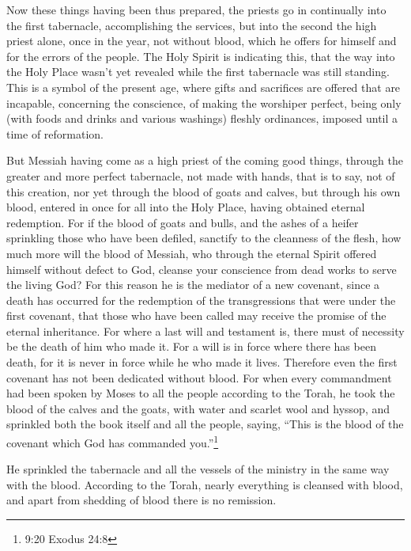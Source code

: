 \myverse{}Now these things having been thus prepared, the priests go in continually
into the first tabernacle, accomplishing the services,
\myverse{}but into the second the high priest alone, once in the year, not without blood,
which he offers for himself and for the errors of the people.
\myverse{}The Holy Spirit is indicating this, that the way into the Holy Place wasn’t
yet revealed while the first tabernacle was still standing.
\myverse{}This is a symbol of the present age, where gifts and sacrifices are offered
that are incapable, concerning the conscience, of making the worshiper perfect,
\myverse{}being only (with foods and drinks and various washings) fleshly ordinances,
imposed until a time of reformation.

\myverse{}But Messiah having come as a high priest of the coming good things,
through the greater and more perfect tabernacle, not made with hands, that is to say, not of this creation,
\myverse{}nor yet through the blood of goats and calves, but through his own blood,
entered in once for all into the Holy Place, having obtained eternal redemption.
\myverse{}For if the blood of goats and bulls, and the ashes of a heifer sprinkling
those who have been defiled, sanctify to the cleanness of the flesh,
\myverse{}how much more will the blood of Messiah, who through the eternal Spirit offered
himself without defect to God, cleanse your conscience from dead works to serve the living God?
\myverse{}For this reason he is the mediator of a new covenant, since a death has occurred
for the redemption of the transgressions that were under the first covenant, that those who have been
called may receive the promise of the eternal inheritance.
\myverse{}For where a last will and testament is, there must of necessity be the death
of him who made it.
\myverse{}For a will is in force where there has been death, for it is never in force
while he who made it lives.
\myverse{}Therefore even the first covenant has not been dedicated without blood.
\myverse{}For when every commandment had been spoken by Moses to all the people according to the Torah,
he took the blood of the calves and the goats, with water and scarlet wool and hyssop, and sprinkled both
the book itself and all the people,
\myverse{}saying, “This is the blood of the covenant which God has commanded you.”\footnote{9:20 Exodus 24:8}

\myverse{}He sprinkled the tabernacle and all the vessels of the ministry
in the same way with the blood.
\myverse{}According to the Torah, nearly everything is cleansed with blood, and apart
from shedding of blood there is no remission.

